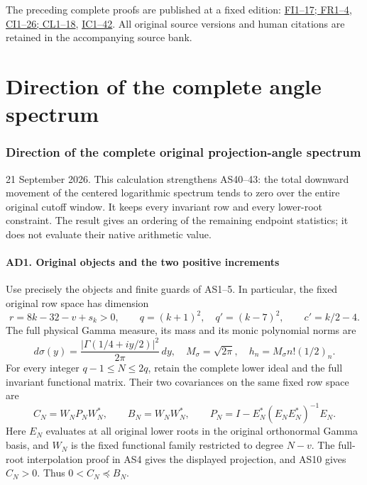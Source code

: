 \documentclass[11pt]{article}
\begin{document}
The preceding complete proofs are published at a fixed edition: \href{https://github.com/KokunoYumeto/zeta-function-research-reader/blob/75256b0237884bdef0074c2ac6310de1ea32ec26/workbenches/splitzero-tandem/continuations/20260921-invariant-collision/FINITE_INVARIANT_PROOFS.md}{FI1--17; FR1--4}, \href{https://github.com/KokunoYumeto/zeta-function-research-reader/blob/75256b0237884bdef0074c2ac6310de1ea32ec26/workbenches/splitzero-tandem/continuations/20260921-invariant-collision/CUTOFF_INNOVATION_PROOFS.md}{CI1--26; CL1--18}, \href{https://github.com/KokunoYumeto/zeta-function-research-reader/blob/75256b0237884bdef0074c2ac6310de1ea32ec26/workbenches/splitzero-tandem/continuations/20260921-invariant-collision/COLLISION_PROOFS.md}{IC1--42}. All original source versions and human citations are retained in the accompanying source bank.

\clearpage\part{Direction of the complete angle spectrum}
\section{Direction of the complete original projection-angle spectrum}\label{direction-of-the-complete-original-projection-angle-spectrum}

21 September 2026. This calculation strengthens AS40--43: the total downward movement of the centered logarithmic spectrum tends to zero over the entire original cutoff window. It keeps every invariant row and every lower-root constraint. The result gives an ordering of the remaining endpoint statistics; it does not evaluate their native arithmetic value.

\subsection{AD1. Original objects and the two positive increments}\label{ad1.-original-objects-and-the-two-positive-increments}

Use precisely the objects and finite guards of AS1--5. In particular, the fixed original row space has dimension \[
r=8k-32-v+s_k>0,\qquad q=(k+1)^2,
\quad q'=(k-7)^2,\qquad c'=k/2-4.
\] The full physical Gamma measure, its mass and its monic polynomial norms are \[
d\sigma(y)=\frac{|\Gamma(1/4+iy/2)|^2}{2\pi}\,dy,
\quad M_\sigma=\sqrt{2\pi},\quad h_n=M_\sigma n!(1/2)_n.
\] For every integer \(q-1\le N\le2q\), retain the complete lower ideal and the full invariant functional matrix. Their two covariances on the same fixed row space are \[
C_N=W_NP_NW_N^*,\qquad B_N=W_NW_N^*,\qquad
P_N=I-E_N^*(E_NE_N^*)^{-1}E_N.
\tag{AD1}
\] Here \(E_N\) evaluates at all original lower roots in the original orthonormal Gamma basis, and \(W_N\) is the fixed functional family restricted to degree \(N-v\). The full-root interpolation proof in AS4 gives the displayed projection, and AS10 gives \(C_N>0\). Thus \(0<C_N\preceq B_N\).
\end{document}
